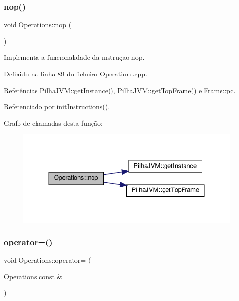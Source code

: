\subsubsection{\texorpdfstring{nop()}{nop()}}
{\footnotesize\ttfamily void Operations\+::nop (\begin{DoxyParamCaption}{ }\end{DoxyParamCaption})\hspace{0.3cm}{\ttfamily [private]}}



Implementa a funcionalidade da instrução nop. 



Definido na linha 89 do ficheiro Operations.\+cpp.



Referências Pilha\+J\+V\+M\+::get\+Instance(), Pilha\+J\+V\+M\+::get\+Top\+Frame() e Frame\+::pc.



Referenciado por init\+Instructions().

Grafo de chamadas desta função\+:\nopagebreak
\begin{figure}[H]
\begin{center}
\leavevmode
\includegraphics[width=324pt]{classOperations_a3426eecc1b88f11cc8317f99d430a201_cgraph}
\end{center}
\end{figure}
\mbox{\label{classOperations_ab6deca5423e5767c3fffef4e5107b627}} 
\subsubsection{\texorpdfstring{operator=()}{operator=()}}
{\footnotesize\ttfamily void Operations\+::operator= (\begin{DoxyParamCaption}\item[{\hyperlink{classOperations}{Operations} const \&}]{ }\end{DoxyParamCaption})\hspace{0.3cm}{\ttfamily [private]}}

